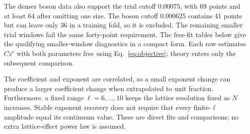 The denser boson data also support the trial cutoff $0.00075$, with
69 points and at least 64 after omitting one size. The boson cutoff
$0.000625$ contains 41 points but can leave only 36 in a training
fold, so it is excluded. The remaining smaller trial windows fail
the same forty-point requirement. The free-fit tables below give
the qualifying smaller-window diagnostics in a compact form.
Each row estimates $Cz^r$ with both parameters free using
Eq.~\eqref{eq:objective}; theory enters only the subsequent comparison.

The coefficient and exponent are correlated, so a small exponent change
can produce a larger coefficient change when extrapolated to unit
fraction. Furthermore, a fixed range $\ell=6,\ldots,10$ keeps the
lattice resolution fixed as $N$ increases. Stable exponent recovery
does not require that every finite-$\ell$ amplitude equal its continuum
value. These are direct fits and comparisons; no extra lattice-effect
power law is assumed.
\begingroup\footnotesize\setlength{\tabcolsep}{4pt}





\endgroup
